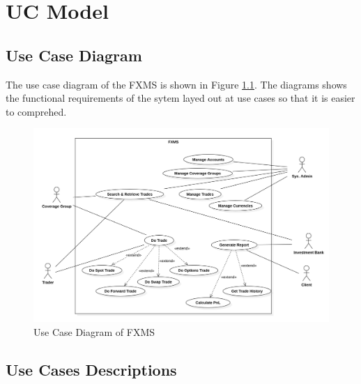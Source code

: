 \documentclass[a4paper]{report}
\begin{document}
\chapter{UC Model}

\section{Use Case Diagram}

The use case diagram of the FXMS is shown in Figure \ref{fig:use-case-diagram}. The diagrams shows the functional requirements of the sytem layed out at use cases so that it is easier to comprehed.

\begin{figure}[h!]
    \centering
    \includegraphics[width=\textwidth]{images/use-case-diagram.png}
    \caption{Use Case Diagram of FXMS}
    \label{fig:use-case-diagram}
\end{figure}

\section{Use Cases Descriptions}
\end{document}
